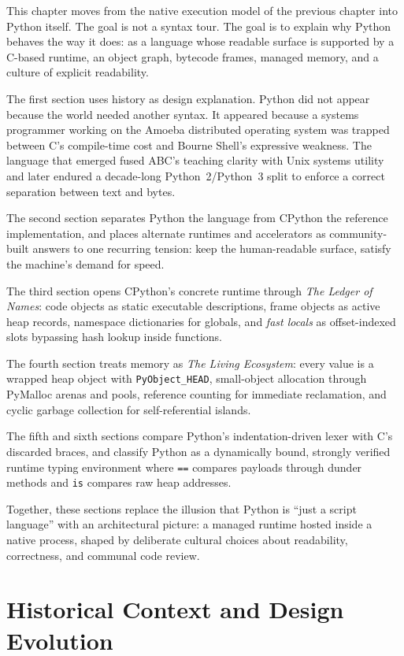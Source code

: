 \documentclass[a4paper,twoside]{report}
\begin{document}
This chapter moves from the native execution model of the previous chapter into Python itself. The goal is not a syntax tour. The goal is to explain why Python behaves the way it does: as a language whose readable surface is supported by a C-based runtime, an object graph, bytecode frames, managed memory, and a culture of explicit readability.

The first section uses history as design explanation. Python did not appear because the world needed another syntax. It appeared because a systems programmer working on the Amoeba distributed operating system was trapped between C's compile-time cost and Bourne Shell's expressive weakness. The language that emerged fused ABC's teaching clarity with Unix systems utility and later endured a decade-long Python~2/Python~3 split to enforce a correct separation between text and bytes.

The second section separates Python the language from CPython the reference implementation, and places alternate runtimes and accelerators as community-built answers to one recurring tension: keep the human-readable surface, satisfy the machine's demand for speed.

The third section opens CPython's concrete runtime through \emph{The Ledger of Names}: code objects as static executable descriptions, frame objects as active heap records, namespace dictionaries for globals, and \emph{fast locals} as offset-indexed slots bypassing hash lookup inside functions.

The fourth section treats memory as \emph{The Living Ecosystem}: every value is a wrapped heap object with \texttt{PyObject\_HEAD}, small-object allocation through PyMalloc arenas and pools, reference counting for immediate reclamation, and cyclic garbage collection for self-referential islands.

The fifth and sixth sections compare Python's indentation-driven lexer with C's discarded braces, and classify Python as a dynamically bound, strongly verified runtime typing environment where \texttt{==} compares payloads through dunder methods and \texttt{is} compares raw heap addresses.

Together, these sections replace the illusion that Python is ``just a script language'' with an architectural picture: a managed runtime hosted inside a native process, shaped by deliberate cultural choices about readability, correctness, and communal code review.


\section{Historical Context and Design Evolution}
\end{document}
